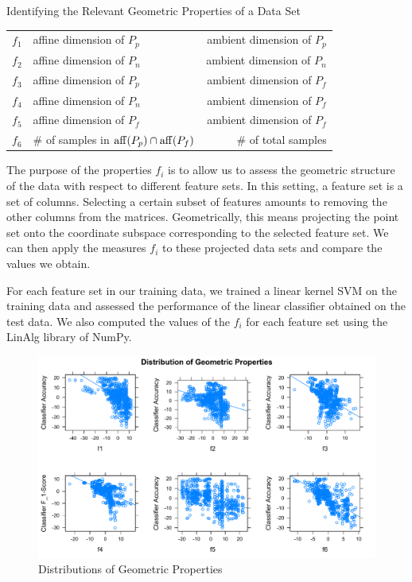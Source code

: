 \documentclass{llncs}
\begin{document}
\begin{section}{Identifying the Relevant Geometric Properties of a Data Set}
\begin{table}[ht]
\begin{tabular}{l l r }
$f_1$&affine dimension of $P_p$& ambient dimension of $P_p$\\
$f_2$&affine dimension of $P_n$& ambient dimension of $P_n$\\
$f_3$&affine dimension of $P_p$& ambient dimension of $P_f$\\
$f_4$&affine dimension of $P_n$& ambient dimension of $P_f$\\
$f_5$&affine dimension of $P_f$& ambient dimension of $P_f$\\
$f_6$&\# of samples in $\operatorname{aff}(P_p)\cap\operatorname{aff}(P_f)$\;\;\;\;\;   &\# of total samples\\
\hline
\end{tabular}
\label{tab:formulas}
\end{table}

The purpose of the properties $f_i$ is to allow us to assess the geometric structure of the data with respect to different feature sets. In this setting, a feature set is a set of columns. Selecting a certain subset of features amounts to removing the other columns from the matrices. Geometrically, this means projecting the point set onto the coordinate subspace corresponding to the selected feature set. We can then apply the measures $f_i$ to these projected data sets and compare the values we obtain.

For each feature set in our training data, we trained a linear kernel SVM on the training data and assessed the performance of the linear classifier obtained on the test data. We also computed the values of the $f_i$ for each feature set using the LinAlg library of NumPy\cite{numpy}.  
\begin{figure}[ht]
\includegraphics[scale = .5]{figures/conf_fig}
\caption{Distributions of Geometric Properties}
\label{fig:AllProps}
\end{figure}


\end{section}
\end{document}
